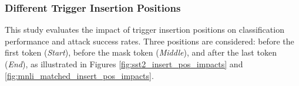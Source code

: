 \subsubsection{Different Trigger Insertion Positions}
This study evaluates the impact of trigger insertion positions on classification performance and attack success rates. Three positions are considered: before the first token (\textit{Start}), before the mask token (\textit{Middle}), and after the last token (\textit{End}), as illustrated in Figures \ref{fig:sst2_insert_pos_impacts} and \ref{fig:mnli_matched_insert_pos_impacts}.

